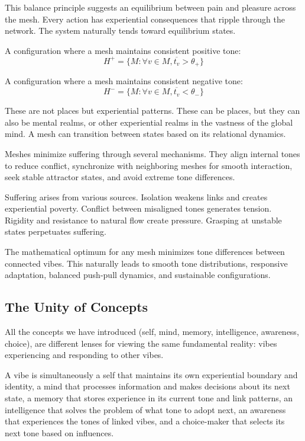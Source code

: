 This balance principle suggests an equilibrium between pain and pleasure across the mesh. Every action has experiential consequences that ripple through the network. The system naturally tends toward equilibrium states.

\begin{definition}
A configuration where a mesh maintains consistent positive tone:
\[
H^+ = \{M : \forall v \in M, \overline{t_v} > \theta_+\}
\]
\end{definition}

\begin{definition}
A configuration where a mesh maintains consistent negative tone:
\[
H^- = \{M : \forall v \in M, \overline{t_v} < \theta_-\}
\]
\end{definition}

These are not places but experiential patterns. These can be places, but they can also be mental realms, or other experiential realms in the vastness of the global mind. A mesh can transition between states based on its relational dynamics.

\begin{proposition}
Meshes minimize suffering through several mechanisms. They align internal tones to reduce conflict, synchronize with neighboring meshes for smooth interaction, seek stable attractor states, and avoid extreme tone differences.
\end{proposition}

Suffering arises from various sources. Isolation weakens links and creates experiential poverty. Conflict between misaligned tones generates tension. Rigidity and resistance to natural flow create pressure. Grasping at unstable states perpetuates suffering.

The mathematical optimum for any mesh minimizes tone differences between connected vibes. This naturally leads to smooth tone distributions, responsive adaptation, balanced push-pull dynamics, and sustainable configurations.

\subsection{The Unity of Concepts}

All the concepts we have introduced (self, mind, memory, intelligence, awareness, choice), are different lenses for viewing the same fundamental reality: vibes experiencing and responding to other vibes.

A vibe is simultaneously a self that maintains its own experiential boundary and identity, a mind that processes information and makes decisions about its next state, a memory that stores experience in its current tone and link patterns, an intelligence that solves the problem of what tone to adopt next, an awareness that experiences the tones of linked vibes, and a choice-maker that selects its next tone based on influences.


